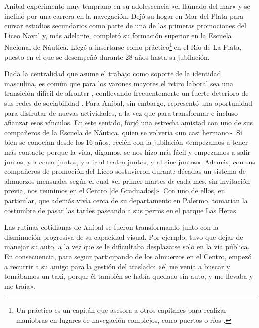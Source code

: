 \begin{refsection}
Aníbal experimentó muy temprano en su adolescencia «el llamado del mar» y se inclinó por una carrera en la navegación. Dejó su hogar en Mar del Plata para cursar estudios secundarios como parte de una de las primeras promociones del Liceo Naval y, más adelante, completó su formación superior en la Escuela Nacional de Náutica. Llegó a insertarse como práctico\footnote{Un práctico es un capitán que asesora a otros capitanes para realizar
        maniobras en lugares de navegación complejos, como puertos o ríos
        \protect\parencite{4171-BORRELLI2022}.} en el Río de La Plata, puesto en el que se desempeñó durante 28 años hasta su jubilación.

Dada la centralidad que asume el trabajo como soporte de la identidad masculina, es común que para los varones mayores el retiro laboral sea una transición difícil de afrontar \protect\parencite{4172-IACUB2017}, conllevando frecuentemente un fuerte deterioro de sus redes de sociabilidad \protect\parencite{4208-ARBER2003}. Para Aníbal, sin embargo, representó una oportunidad para disfrutar de nuevas actividades, a la vez que para transformar e incluso afianzar esos vínculos. En este sentido, forjó una estrecha amistad con uno de sus compañeros de la Escuela de Náutica, quien se volvería «un casi hermano». Si bien se conocían desde los 16 años, recién con la jubilación «empezamos a tener más contacto porque la vida, digamos, se nos hizo más fácil y empezamos a salir juntos, y a cenar juntos, y a ir al teatro juntos, y al cine juntos». Además, con sus compañeros de promoción del Liceo sostuvieron durante décadas un sistema de almuerzos mensuales según el cual «el primer martes de cada mes, sin invitación previa, nos reunimos en el Centro [de Graduados]». Con uno de ellos, en particular, que además vivía cerca de su departamento en Palermo, tomarían la costumbre de pasar las tardes paseando a sus perros en el parque Las Heras.

Las rutinas cotidianas de Aníbal se fueron transformando junto con la disminución progresiva de su capacidad visual. Por ejemplo, tuvo que dejar de manejar su auto, a la vez que se le dificultaba desplazarse solo en la vía pública. En consecuencia, para seguir participando de los almuerzos en el Centro, empezó a recurrir a su amigo para la gestión del traslado: «él me venía a buscar y tomábamos un taxi, porque él también se había quedado sin auto, y me llevaba y me traía».


\end{refsection}
